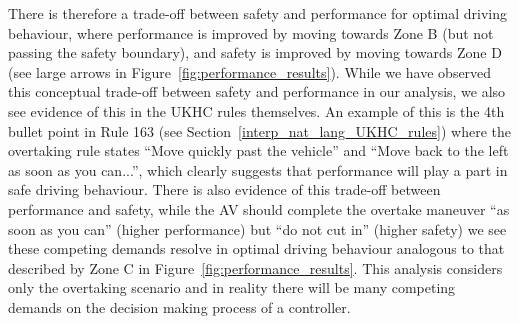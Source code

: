 There is therefore a trade-off between safety and performance for optimal driving behaviour, where performance is improved by moving towards Zone B (but not passing the safety boundary), and safety is improved by moving towards Zone D (see large arrows in Figure~\ref{fig:performance_results}). While we have observed this conceptual trade-off between safety and performance in our analysis, we also see evidence of this in the UKHC rules themselves. An example of this is the 4th bullet point in Rule 163 (see Section~\ref{interp_nat_lang_UKHC_rules}) where the overtaking rule states ``Move quickly past the vehicle'' and ``Move back to the left as soon as you can...'', which clearly suggests that performance will play a part in safe driving behaviour. There is also evidence of this trade-off between performance and safety, while the AV should complete the overtake maneuver ``as soon as you can'' (higher performance) but ``do not cut in'' (higher safety) we see these competing demands resolve in optimal driving behaviour analogous to that described by Zone C in Figure~\ref{fig:performance_results}. This analysis considers only the overtaking scenario and in reality there will be many competing demands on the decision making process of a controller. 





